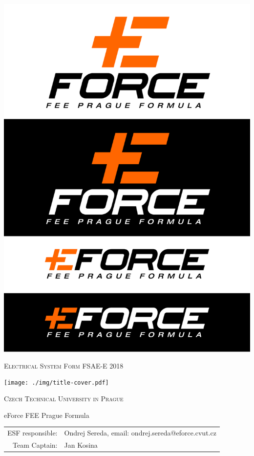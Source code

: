 	\centering	
\includegraphics[width=\textwidth, trim={0cm 6cm 0cm 20cm}, clip]{./img/title-logo.pdf}
\vspace{.5cm}
{\scshape\huge Electrical System Form FSAE-E 2018 \par}
\vspace{.5cm}
\texttt{[image: ./img/title-cover.pdf]}	
\vspace{.5cm}
{\scshape\Large Czech Technical University in Prague\par}
\vspace{.5cm}
{\LARGE eForce FEE Prague Formula\par}
\vspace{.5cm}


\begin{table}[H]
	\centering
	\begin{tabular}{rl}
		ESF responsible: &  Ondrej Sereda, email: ondrej.sereda@eforce.cvut.cz \\
		Team Captain: & Jan Kosina   \\
	\end{tabular}%
	\label{tab:addlabel}%
\end{table}%



\vfill